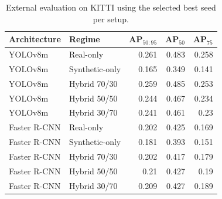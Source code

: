 \begin{table}
\caption{External evaluation on KITTI using the selected best seed per setup.}
\label{tab:add_kitti_results}
\begin{tabular}{llrrr}
\toprule
Architecture & Regime & AP$_{50:95}$ & AP$_{50}$ & AP$_{75}$ \\
\midrule
YOLOv8m & Real-only & 0.261 & 0.483 & 0.258 \\
YOLOv8m & Synthetic-only & 0.165 & 0.349 & 0.141 \\
YOLOv8m & Hybrid 70/30 & 0.259 & 0.485 & 0.253 \\
YOLOv8m & Hybrid 50/50 & 0.244 & 0.467 & 0.234 \\
YOLOv8m & Hybrid 30/70 & 0.241 & 0.461 & 0.23 \\
Faster R-CNN & Real-only & 0.202 & 0.425 & 0.169 \\
Faster R-CNN & Synthetic-only & 0.181 & 0.393 & 0.151 \\
Faster R-CNN & Hybrid 70/30 & 0.202 & 0.417 & 0.179 \\
Faster R-CNN & Hybrid 50/50 & 0.21 & 0.427 & 0.19 \\
Faster R-CNN & Hybrid 30/70 & 0.209 & 0.427 & 0.189 \\
\bottomrule
\end{tabular}
\end{table}
